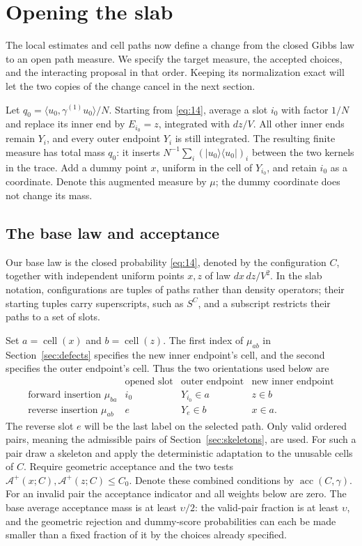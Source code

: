 \section{Opening the slab}\label{sec:opening}

The local estimates and cell paths now define a change from the closed
Gibbs law to an open path measure. We specify the target measure, the
accepted choices, and the interacting proposal in that order. Keeping
its normalization exact will let the two copies of the change cancel
in the next section.

Let \(q_0=\langle u_0,\gamma^{(1)}u_0\rangle/N\). Starting from
\eqref{eq:14}, average a slot \(i_0\) with factor \(1/N\) and replace
its inner end by \(E_{i_0}=z\), integrated with \(dz/V\). All other
inner ends remain \(Y_i\), and every outer endpoint \(Y_i\) is still
integrated. The resulting finite measure has total mass \(q_0\): it
inserts \(N^{-1}\sum_i(|u_0\rangle\langle u_0|)_i\) between the two
kernels in the trace. Add a dummy point \(x\), uniform in the cell of
\(Y_{i_0}\), and retain \(i_0\) as a coordinate. Denote this augmented
measure by \(\mu\); the dummy coordinate does not change its mass.

\subsection{The base law and acceptance}
Our base law is the closed probability \eqref{eq:14}, denoted by the
configuration $C$, together with independent uniform points $x,z$ of
law $dx\,dz/V^2$. In the slab notation, configurations are tuples of
paths rather than density operators; their starting tuples carry
superscripts, such as $S^C$, and a subscript restricts their paths to
a set of slots.

Set $a=\operatorname{cell}(x)$ and $b=\operatorname{cell}(z)$.
The first index of $\mu_{ab}$ in Section~\ref{sec:defects} specifies
the new inner endpoint's cell, and the second specifies the outer
endpoint's cell. Thus the two orientations used below are
\[
\begin{array}{c|c|c|c}
 &\text{opened slot}&\text{outer endpoint}&\text{new inner endpoint}\\ \hline
 \text{forward insertion }\mu_{ba}&i_0&Y_{i_0}\in a&z\in b\\
 \text{reverse insertion }\mu_{ab}&e&Y_e\in b&x\in a.
\end{array}
\]
The reverse slot $e$ will be the last label on the selected path.
Only valid ordered pairs, meaning the admissible pairs of
Section~\ref{sec:skeletons}, are used. For such a pair draw a skeleton
and apply the deterministic adaptation to the unusable cells of $C$.
Require geometric acceptance and the two tests
$\mathcal A^+(x;C),\mathcal A^+(z;C)\le C_0$.
Denote these combined conditions by $\operatorname{acc}(C,\gamma)$.
For an invalid pair the acceptance indicator and all weights below
are zero. The base average acceptance mass is at least $\upsilon/2$:
the valid-pair fraction is at least $\upsilon$, and the geometric
rejection and dummy-score probabilities can each be made smaller
than a fixed fraction of it by the choices already specified.

